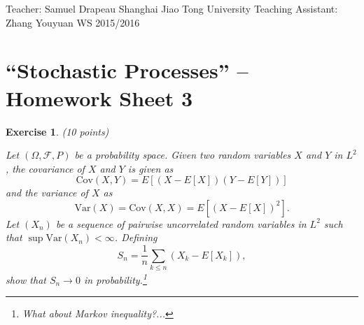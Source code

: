 \documentclass[DIV=classic,a4paper,10pt]{scrartcl}
\newtheorem{exercise}[theorem]{Exercise}
\theoremstyle{nonumberplain}
\numberwithin{equation}{section}
\begin{document}
\noindent
Teacher: Samuel Drapeau \hfill Shanghai Jiao Tong University \newline
Teaching Assistant: Zhang Youyuan \hfill WS 2015/2016

\smallskip
\noindent
\hrulefill

\smallskip

\setcounter{section}{3}

\pagestyle{empty}


\section*{``Stochastic Processes'' -- Homework Sheet 3}
\thispagestyle{empty}


\begin{exercise}(10 points)

    Let $(\Omega,\mathcal{F},P)$ be a probability space.
    Given two random variables $X$ and $Y$ in $L^2$, the covariance of $X$ and $Y$ is given as
    \begin{equation*}
        \text{Cov}(X,Y)=E\left[ \left( X-E[X] \right)\left( Y-E[Y] \right) \right]
    \end{equation*}
    and the variance of $X$ as
    \begin{equation*}
        \text{Var}(X)=\text{Cov}(X,X)=E\left[ \left( X-E[X] \right)^2 \right].
    \end{equation*}
    Let $(X_n)$ be a sequence of pairwise uncorrelated random variables in $L^2$ such that $\sup \text{Var}(X_n)<\infty$.
    Defining
    \begin{equation*}
        S_n=\frac{1}{n} \sum_{k\leq n}\left(X_k-E[X_k]\right),
    \end{equation*}
    show that $S_n\to 0$ in probability.\footnote{What about Markov inequality?...}
\end{exercise}
\end{document}
